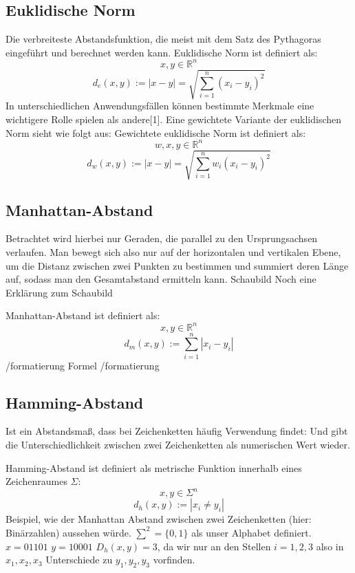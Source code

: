 \documentclass[fontsize=11pt]{scrartcl}
\begin{document}
            \subsection{Euklidische Norm}
                Die verbreiteste Abstandsfunktion, die meist mit dem Satz des Pythagoras eingeführt und berechnet werden kann.
                Euklidische Norm ist definiert als:
                $$ x,y \in \mathbb{R}^n $$
                $$
                    d_e(x,y):= |x - y| = \sqrt{\sum_{i=1}^{n}(x_i -y_i)^2}
                $$        
                In unterschiedlichen Anwendungsfällen können bestimmte Merkmale eine wichtigere Rolle spielen als andere[1]. Eine gewichtete Variante der euklidischen Norm sieht wie folgt aus:
                Gewichtete euklidische Norm ist definiert als:
                $$w,x,y \in \mathbb{R}^n $$
                $$
                    d_w(x,y):= |x - y| = \sqrt{\sum_{i=1}^{n}w_i(x_i -y_i)^2}
                $$     
            
            \subsection{Manhattan-Abstand}
                Betrachtet wird hierbei nur Geraden, die parallel zu den Ursprungsachsen verlaufen. Man bewegt sich also nur auf der horizontalen und vertikalen Ebene, um die Distanz zwischen zwei Punkten zu bestimmen und summiert deren Länge auf, sodass man den Gesamtabstand ermitteln kann.
                Schaubild
                Noch eine Erklärung zum Schaubild

                Manhattan-Abstand ist definiert als:
                $$
                    x,y \in \mathbb{R}^n 
                $$
                $$
                    d_m(x,y):= \sum_{i=1}^{n} |x_i -y_i|
                $$
                /formatierung
                Formel
                /formatierung
                         
            \subsection{Hamming-Abstand}
                Ist ein Abstandsmaß, dass bei Zeichenketten häufig Verwendung findet:
                Und gibt die Unterschiedlichkeit zwischen zwei Zeichenketten als numerischen Wert wieder.
                        
                Hamming-Abstand ist definiert als metrische Funktion innerhalb eines Zeichenraumes 
                $\Sigma$:
	            $$ x,y \in \Sigma^n $$
	            $$ d_h(x,y):= |x_i \neq y_i |$$
                Beispiel, wie der Manhattan Abstand zwischen zwei Zeichenketten (hier: Binärzahlen) aussehen würde.
                $\sum^2=\{0,1\}$ als unser Alphabet definiert.
                $x = 01101$
                $y= 10001$
                $D_h(x,y)=3$, da wir nur an den Stellen $i={1,2,3}$ also in $ x_1,x_2,x_3$ Unterschiede zu $y_1,y_2,y_3$ vorfinden.
                        
\end{document}
